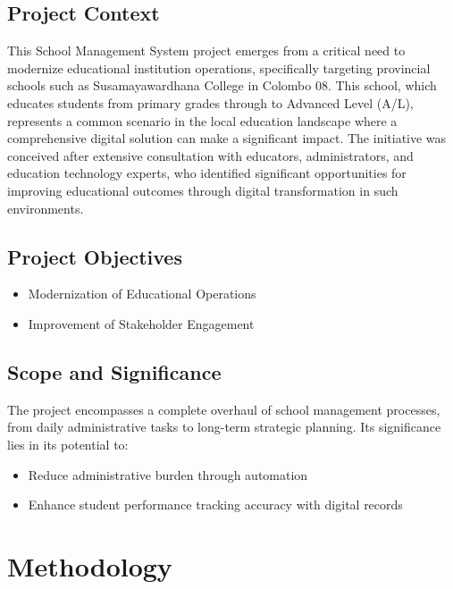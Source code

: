 \documentclass[12pt,a4paper]{report}
\begin{document}
\section{Project Context}
This School Management System project emerges from a critical need to modernize educational institution operations, specifically targeting provincial schools such as Susamayawardhana College in Colombo 08. This school, which educates students from primary grades through to Advanced Level (A/L), represents a common scenario in the local education landscape where a comprehensive digital solution can make a significant impact. The initiative was conceived after extensive consultation with educators, administrators, and education technology experts, who identified significant opportunities for improving educational outcomes through digital transformation in such environments.

\section{Project Objectives}
\begin{itemize}
    \item Modernization of Educational Operations
    \item Improvement of Stakeholder Engagement
\end{itemize}

\section{Scope and Significance}
The project encompasses a complete overhaul of school management processes, from daily administrative tasks to long-term strategic planning. Its significance lies in its potential to:
\begin{itemize}
    \item Reduce administrative burden through automation
    \item Enhance student performance tracking accuracy with digital records
\end{itemize}

\chapter{Methodology}
\end{document}

